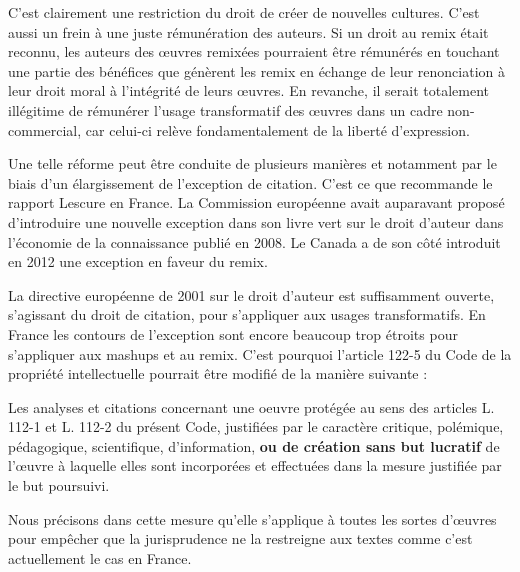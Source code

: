 C’est clairement une restriction du droit de créer de nouvelles cultures. C'est aussi un frein à une juste rémunération des auteurs. Si un droit au remix était reconnu, les auteurs des œuvres remixées pourraient être rémunérés en touchant une partie des bénéfices que génèrent les remix en échange de leur renonciation à leur droit moral à l'intégrité de leurs œuvres. En revanche, il serait totalement illégitime de rémunérer l'usage transformatif des œuvres dans un cadre non-commercial, car celui-ci relève fondamentalement de la liberté d'expression. 

Une telle réforme peut être conduite de plusieurs manières et notamment par le biais d'un élargissement de l'exception de citation. C’est ce que recommande le rapport Lescure en France. La Commission européenne avait auparavant proposé d'introduire une nouvelle exception dans son livre vert sur le droit d'auteur dans l'économie de la connaissance publié en 2008. Le Canada a de son côté introduit en 2012 une exception en faveur du remix.  

La directive européenne de 2001 sur le droit d’auteur est suffisamment ouverte, s'agissant du droit de citation, pour s'appliquer aux usages transformatifs. En France les contours de l'exception sont encore beaucoup trop étroits pour s'appliquer aux mashups et au remix. C'est pourquoi l’article 122-5 du Code de la propriété intellectuelle pourrait être modifié de la manière suivante :

\begin{mesure}
Les analyses et citations concernant une oeuvre protégée au sens des articles L. 112-1 et L. 112-2 du présent Code, justifiées par le caractère critique, polémique, pédagogique, scientifique, d’information, \textbf{ou de création sans but lucratif} de l’œuvre à laquelle elles sont incorporées et effectuées dans la mesure justifiée par le but poursuivi.
\end{mesure}

Nous précisons dans cette mesure qu'elle s'applique à toutes les sortes d'œuvres pour empêcher que la jurisprudence ne la restreigne aux textes comme c'est actuellement le cas en France.


